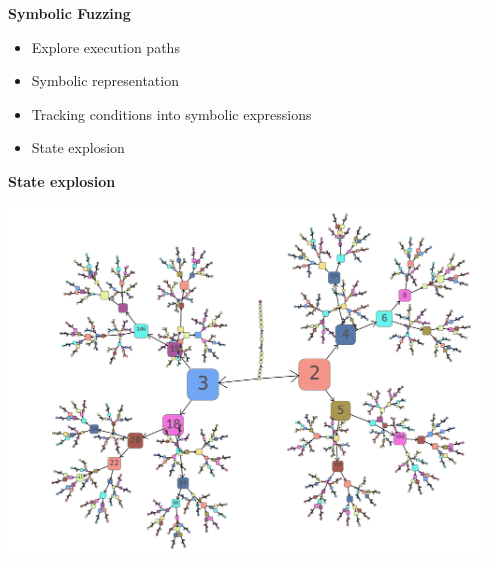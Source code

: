 \begin{frame}
			\textbf{Symbolic Fuzzing}
	        \vspace{1.8mm}
			\small
			\begin{itemize}
				\item Explore execution paths
				\item Symbolic representation
				\item Tracking conditions into symbolic expressions
				\item State explosion
			\end{itemize}
\end{frame}

\begin{frame}
    \vspace{3.0mm}
    \textbf{State explosion}
    \begin{center}
        \includegraphics[width=0.95\textwidth]{assets/state-splitter-alpha.png}
    \end{center}
\end{frame}
